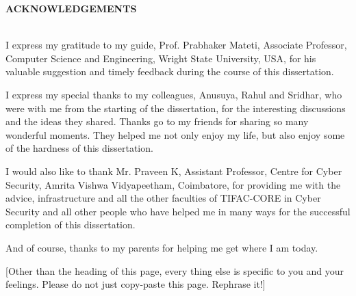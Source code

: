 \newpage
\thispagestyle{plain}

{\centering\bf  ACKNOWLEDGEMENTS\\}\par\vskip 2cm

\singleSpacing
{}\\

\noindent
I express my gratitude to my guide, Prof. Prabhaker Mateti, Associate
Professor, Computer Science and Engineering, Wright State University,
USA, for his valuable suggestion and timely feedback during the course
of this dissertation.

I express my special thanks to my colleagues, Anusuya, Rahul and
Sridhar, who were with me from the starting of the dissertation, for
the interesting discussions and the ideas they shared. Thanks go to my
friends for sharing so many wonderful moments. They helped me not only
enjoy my life, but also enjoy some of the hardness of this
dissertation.

I would also like to thank Mr. Praveen K, Assistant Professor, Centre for
Cyber Security, Amrita Vishwa Vidyapeetham, Coimbatore, for providing
me with the advice, infrastructure and all the other faculties of
TIFAC-CORE in Cyber Security and all other people who have helped me
in many ways for the successful completion of this dissertation.

And of course, thanks to my parents for helping me get where I am
today.


\vfill

\noindent
\TBD{} [Other than the heading of this page, every thing else is
specific to you and your feelings.  Please do not just copy-paste this
page.  Rephrase it!]

\doubleSpacing

\newpage




